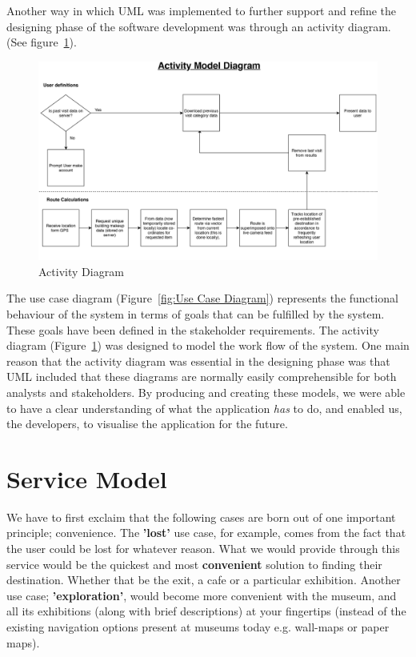Another way in which UML was implemented to further support and refine the designing phase of the software development was through an activity diagram. (See figure~\ref{fig:Activity Diagram}).

\begin{figure}[H]
    \centering
    \includegraphics[width=\textwidth]
    {assets/Activity_Diagram.pdf}
    \caption{Activity Diagram}
    \label{fig:Activity Diagram}
\end{figure}

The use case diagram (Figure~\ref{fig:Use Case Diagram}) represents the functional behaviour of the system in terms of goals that can be fulfilled by the system. These goals have been defined in the stakeholder requirements. The activity diagram (Figure~\ref{fig:Activity Diagram}) was designed to model the work flow of the system. One main reason that the activity diagram was essential in the designing phase was that UML included that these diagrams are normally easily comprehensible for both analysts and stakeholders. By producing and creating these models, we were able to have a clear understanding of what the application \textit{has} to do, and enabled us, the developers, to visualise the application for the future.

\section{Service Model}

We have to first exclaim that the following cases are born out of one important principle; convenience. The \textbf{'lost'} use case, for example, comes from the fact that the user could be lost for whatever reason. What we would provide through this service would be the quickest and most \textbf{convenient} solution to finding their destination. Whether that be the exit, a cafe or a particular exhibition. Another use case;
\textbf{'exploration'}, would become more convenient with the museum, and all its exhibitions (along with brief descriptions) at your fingertips (instead of the existing navigation options present at museums today e.g. wall-maps or paper maps).
